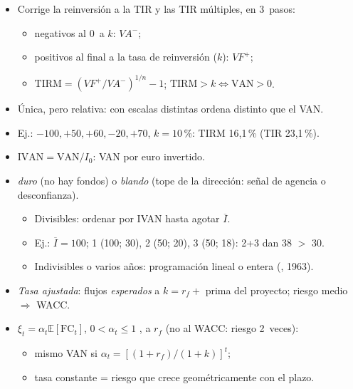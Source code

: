\documentclass{article}
\begin{document}
\begin{columnas}
\begin{itemize}
\end{itemize}
\begin{itemize}
\item Corrige la reinversión a la TIR y las TIR múltiples, en 3~pasos:
  \begin{itemize}
  \item negativos al 0~a $k$: $VA^{-}$;
  \item positivos al final a la tasa de reinversión ($k$): $VF^{+}$;
  \item $\mathrm{TIRM}=(VF^{+}/VA^{-})^{1/n}-1$; $\mathrm{TIRM}>k\iff\mathrm{VAN}>0$.
  \end{itemize}
\item Única, pero relativa: con escalas distintas ordena distinto que el VAN.
\item Ej.: $-100,+50,+60,-20,+70$, $k=10$\,\%: TIRM 16,1\,\% (TIR 23,1\,\%).
\end{itemize}
\begin{itemize}
\item $\mathrm{IVAN}=\mathrm{VAN}/I_0$: VAN por euro invertido.
\item {} \emph{duro} (no hay fondos) o \emph{blando} (tope de la dirección: señal de agencia o desconfianza).
  \begin{itemize}
  \item Divisibles: ordenar por IVAN hasta agotar $\overline I$.
  \item Ej.: $\overline I=100$; 1 (100; 30), 2 (50; 20), 3 (50; 18): 2+3 dan 38 $>$ 30.
  \item Indivisibles o varios años: programación lineal o entera (, 1963).
  \end{itemize}
\end{itemize}
\begin{itemize}
\item \emph{Tasa ajustada}: flujos \emph{esperados} a $k=r_f+$ prima del proyecto; riesgo medio $\Rightarrow$ WACC.
\item {} $\xi_t=\alpha_t\mathbb{E}[\mathrm{FC}_t]$, $0<\alpha_t\leq1$ , a $r_f$ (no al WACC: riesgo 2~veces):
  \begin{itemize}
  \item mismo VAN si $\alpha_t=[(1+r_f)/(1+k)]^t$;
  \item tasa constante = riesgo que crece geométricamente con el plazo.

\end{itemize}
\end{itemize}
\end{columnas}
\end{document}
